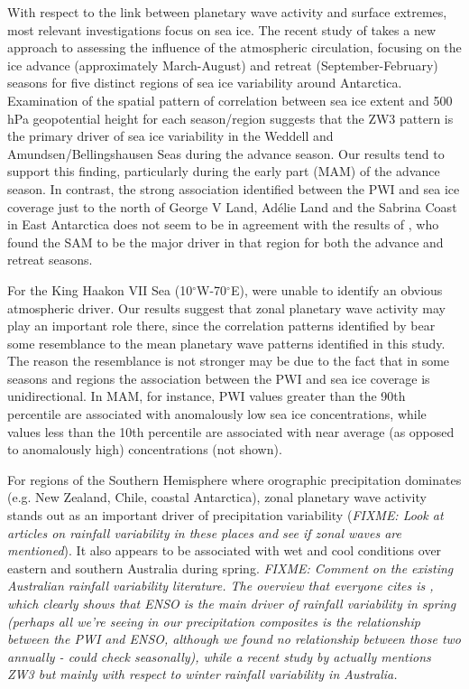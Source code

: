 With respect to the link between planetary wave activity and surface extremes, most relevant investigations focus on sea ice. The recent study of \citet{Raphael2014} takes a new approach to assessing the influence of the atmospheric circulation, focusing on the ice advance (approximately March-August) and retreat (September-February) seasons for five distinct regions of sea ice variability around Antarctica. Examination of the spatial pattern of correlation between sea ice extent and 500 hPa geopotential height for each season/region suggests that the ZW3 pattern is the primary driver of sea ice variability in the Weddell and Amundsen/Bellingshausen Seas during the advance season. Our results tend to support this finding, particularly during the early part (MAM) of the advance season. In contrast, the strong association identified between the PWI and sea ice coverage just to the north of George V Land, Ad{\'e}lie Land and the Sabrina Coast in East Antarctica does not seem to be in agreement with the results of \citet{Raphael2014}, who found the SAM to be the major driver in that region for both the advance and retreat seasons. 

For the King Haakon VII Sea (10$^{\circ}$W-70$^{\circ}$E), \citet{Raphael2014} were unable to identify an obvious atmospheric driver. Our results suggest that zonal planetary wave activity may play an important role there, since the correlation patterns identified by \citet{Raphael2014} bear some resemblance to the mean planetary wave patterns identified in this study. The reason the resemblance is not stronger may be due to the fact that in some seasons and regions the association between the PWI and sea ice coverage is unidirectional. In MAM, for instance, PWI values greater than the 90th percentile are associated with anomalously low sea ice concentrations, while values less than the 10th percentile are associated with near average (as opposed to anomalously high) concentrations (not shown).

For regions of the Southern Hemisphere where orographic precipitation dominates (e.g. New Zealand, Chile, coastal Antarctica), zonal planetary wave activity stands out as an important driver of precipitation variability (\textit{FIXME: Look at articles on rainfall variability in these places and see if zonal waves are mentioned}). It also appears to be associated with wet and cool conditions over eastern and southern Australia during spring. \textit{FIXME: Comment on the existing Australian rainfall variability literature. The overview that everyone cites is \citet{Risbey2009}, which clearly shows that ENSO is the main driver of rainfall variability in spring (perhaps all we're seeing in our precipitation composites is the relationship between the PWI and ENSO, although we found no relationship between those two annually - could check seasonally), while a recent study by \citet{Frederiksen2014} actually mentions ZW3 but mainly with respect to winter rainfall variability in Australia.}

